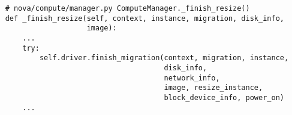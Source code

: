 \documentclass[a4paper,left=1.5cm,right=1.5cm,11pt]{article}
\begin{document}
	\begin{lstlisting}
	# nova/compute/manager.py ComputeManager._finish_resize()
	def _finish_resize(self, context, instance, migration, disk_info,
                       image):
        ...
        try:
            self.driver.finish_migration(context, migration, instance,
                                         disk_info,
                                         network_info,
                                         image, resize_instance,
                                         block_device_info, power_on)
        ...
	\end{lstlisting}
\end{document}
